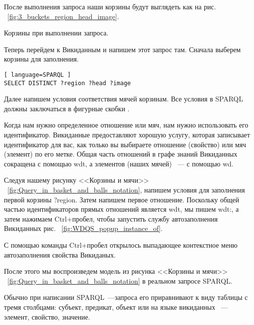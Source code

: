 \newpage
После выполнения запроса наши корзины будут выглядеть как на рис. ~\ref{fig:3_buckets_region_head_image}.

\begin{marginfigure}
	{
		\setlength{\fboxsep}{0pt}%
		\setlength{\fboxrule}{1pt}%
	}
    \caption{Корзины при выполнении запроса.}
	\label{fig:3_buckets_region_head_image}
\end{marginfigure}

Теперь перейдем к Викиданным и напишем этот запрос там. Сначала выберем корзины для заполнения.

\begin{lstlisting}[ language=SPARQL ]
SELECT DISTINCT ?region ?head ?image
\end{lstlisting}

Далее напишем условия соответствия мячей корзинам. Все условия в SPARQL должны заключаться в фигурные скобки {}.

Когда нам нужно определенное отношение или мяч, нам нужно использовать его идентификатор. Викиданные предоставляют хорошую услугу, которая записывает идентификатор для вас, как только вы выбираете отношение (свойство) или мяч (элемент) по его метке. Общая часть отношений в графе знаний Викиданных сокращена с помощью wdt, а элементов (наших мячей) ~--- с помощью wd.

Следуя нашему рисунку <<Корзины и мячи>> ~\ref{fig:Query_in_basket_and_balls_notation}, напишем условия для заполнения первой корзины ?region. Затем напишем первое отношение. Поскольку общей частью идентификаторов прямых отношений является wdt, мы пишем wdt:, а затем нажимаем Ctrl+пробел, чтобы запустить службу автозаполнения Викиданных рис. ~\ref{fig:WDQS_popup_instance_of}.

\begin{marginfigure}[-2.5cm]
	{
		\setlength{\fboxsep}{0pt}%
		\setlength{\fboxrule}{1pt}%
	}
    \caption{С помощью команды Ctrl+пробел открылось выпадающее контекстное меню автозаполнения свойства Викиданых.}
	\label{fig:WDQS_popup_instance_of}
\end{marginfigure}

После этого мы воспроизведем модель из рисунка <<Корзины и мячи>> ~\ref{fig:Query_in_basket_and_balls_notation} в реальном запросе SPARQL.

Обычно при написании SPARQL~---запроса его приравнивают к виду таблицы с тремя столбцами: субъект, предикат, объект или на языке викиданных ~--- элемент, свойство, значение.

